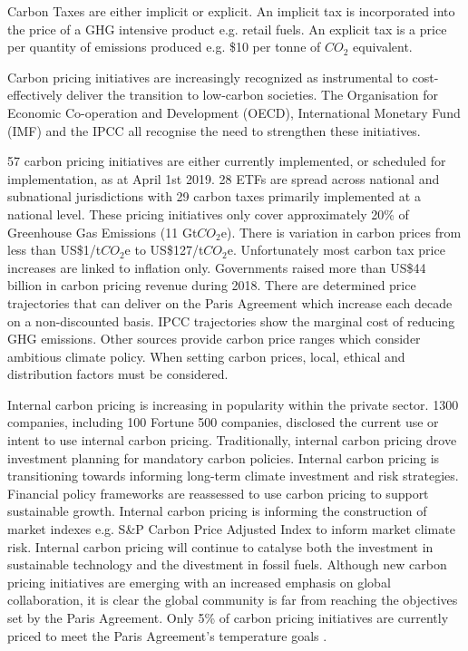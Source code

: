\documentclass[12pt]{article}
\begin{document}
Carbon Taxes are either implicit or explicit. An implicit tax is incorporated into the price of a GHG intensive product e.g. retail fuels. 
An explicit tax is a price per quantity of emissions produced e.g. \$10 per tonne of $CO_2$ equivalent.

Carbon pricing initiatives are increasingly recognized as instrumental to cost-effectively deliver the transition to low-carbon societies. 
The Organisation for Economic Co-operation and Development (OECD), International Monetary Fund (IMF) and the IPCC all recognise the need to strengthen these initiatives.

57 carbon pricing initiatives are either currently implemented, or scheduled for implementation, as at April 1st 2019. 
28 ETFs are spread across national and subnational jurisdictions with 29 carbon taxes primarily implemented at a national level. 
These pricing initiatives only cover approximately 20\% of Greenhouse Gas Emissions (11 Gt$CO_2$e). 
There is variation in carbon prices from less than US\$1/t$CO_2$e to US\$127/t$CO_2$e. 
Unfortunately most carbon tax price increases are linked to inflation only. 
Governments raised more than US\$44 billion in carbon pricing revenue during 2018.
There are determined price trajectories that can deliver on the Paris Agreement which increase each decade on a non-discounted basis.
IPCC trajectories show the marginal cost of reducing GHG emissions.
Other sources provide carbon price ranges which consider ambitious climate policy.
When setting carbon prices, local, ethical and distribution factors must be considered.

Internal carbon pricing is increasing in popularity within the private sector. 
1300 companies, including 100 Fortune 500 companies, disclosed the current use or intent to use internal carbon pricing. 
Traditionally, internal carbon pricing drove investment planning for mandatory carbon policies. 
Internal carbon pricing is transitioning towards informing long-term climate investment and risk strategies.
Financial policy frameworks are reassessed to use carbon pricing to support sustainable growth. 
Internal carbon pricing is informing the construction of market indexes e.g. S\&P Carbon Price Adjusted Index to inform market climate risk.
Internal carbon pricing will continue to catalyse both the investment in sustainable technology and the divestment in fossil fuels.
Although new carbon pricing initiatives are emerging with an increased emphasis on global collaboration, it is clear the global community is far from reaching the objectives set by the Paris Agreement. 
Only 5\% of carbon pricing initiatives are currently priced to meet the Paris Agreement's temperature goals \cite{TR:7}.
\end{document}
